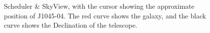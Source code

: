 \documentclass[11pt]{article}
\begin{document}
\begin{figure}[h]
 \centering
  \caption{Scheduler \& SkyView, with the cursor showing the approximate position of J1045-04.  The red curve shows the galaxy, and the black curve shows the Declination of the telescope.}
  \label{fig:ssv}
\end{figure}
\end{document}
